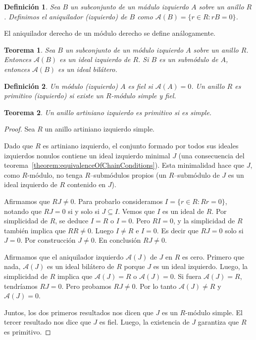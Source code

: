 \documentclass{report}
\newtheorem{theorem}{Teorema}
\newtheorem{definition}{Definición}
\begin{document}
  \begin{definition}
    Sea \(B\) un subconjunto de un mádulo izquierdo \(A\) sobre un anillo \(R\).
    Definimos el \emph{aniquilador (izquierdo)} de \(B\) como \(\mathcal{A}(B) = \{r \in R : r B = 0\}\).
  \end{definition}

  El aniquilador derecho de un módulo derecho se define análogamente.

  \begin{theorem}\label{theorem:anihilatorTheorem}
    Sea \(B\) un subconjunto de un módulo izquierdo \(A\) sobre un anillo \(R\).
    Entonces \(\mathcal{A}(B)\) es un ideal izquierdo de \(R\).
    Si \(B\) es un submódulo de \(A\), entonces \(\mathcal{A}(B)\) es un ideal bilátero.
  \end{theorem}

  \begin{definition}
    Un módulo (izquierdo) \(A\) es \emph{fiel} si \(\mathcal{A}(A) = 0\).
    Un anillo \(R\) es \emph{primitivo} (\emph{izquierdo}) si existe un \(R\)-módulo simple y fiel.
  \end{definition}

  \begin{theorem}\label{theorem:simpleLeftArtinianRingsArePrimitive}
    Un anillo artiniano izquierdo es primitivo si es simple.
  \end{theorem}
  \begin{proof}
    Sea \(R\) un anillo artiniano izquierdo simple.

    Dado que \(R\) es artiniano izquierdo, el conjunto formado por todos sus ideales izquierdos nonulos contiene un ideal izquierdo minimal \(J\) (una consecuencia del teorema~\ref{theorem:equivalenceOfChainConditions}).
    Esta minimalidad hace que \(J\), como \(R\)-módulo, no tenga \(R\)--submódulos propios (un \(R\)--submódulo de \(J\) es un ideal izquierdo de \(R\) contenido en \(J\)).

    Afirmamos que \(R J \neq 0\).
    Para probarlo consideramos \(I = \{r \in R :  R r = 0\}\), notando que \(R J = 0\) si y solo si \(J \subseteq I\).
    Vemos que \(I\) es un ideal de \(R\).
    Por simplicidad de \(R\), se deduce \(I = R\) o \(I = 0\).
    Pero \(R I = 0\), y la simplicidad de \(R\) también implica que \(R R \neq 0\).
    Luego \(I \neq R\) e \(I = 0\).
    Es decir que \(R J = 0\) solo si \(J = 0\).
    Por construcción \(J \neq 0\).
    En conclusión \(R J \neq 0\).

    Afirmamos que el aniquilador izquierdo \(\mathcal{A}(J)\) de \(J\) en \(R\) es cero.
    Primero que nada, \(\mathcal{A}(J)\) es un ideal bilátero de \(R\) porque \(J\) es un ideal izquierdo.
    Luego, la simplicidad de \(R\) implica que \(\mathcal{A}(J) = R\) o \(\mathcal{A}(J) = 0\).
    Si fuera \(\mathcal{A}(J) = R\), tendríamos \(R J = 0\).
    Pero probamos \(R J \neq 0\).
    Por lo tanto \(\mathcal{A}(J) \neq R\) y \(\mathcal{A}(J) = 0\).

    Juntos, los dos primeros resultados nos dicen que \(J\) es un \(R\)-módulo simple.
    El tercer resultado nos dice que \(J\) es fiel.
    Luego, la existencia de \(J\) garantiza que \(R\) es primitivo.
  \end{proof}
\end{document}
